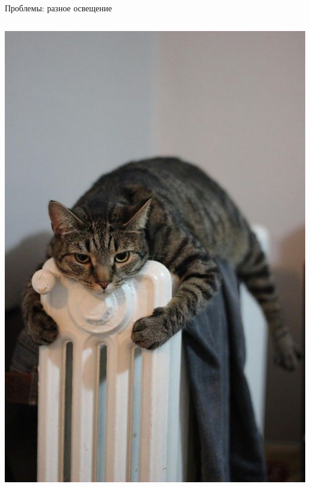\documentclass[aspectratio=169, professionalfonts]{beamer}
\begin{document}
\begin{frame}{Проблемы: разное освещение}
\begin{columns}
\begin{column}{.325\linewidth}
            \includegraphics[width=\linewidth]{graphs/fig12_3.jpg}
        \end{column}
    \end{columns}
\end{frame}
\end{document}
